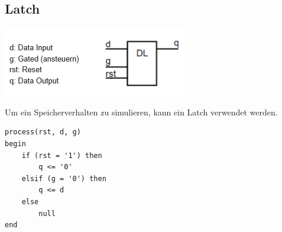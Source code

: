 \subsection{Latch}
\begin{center}
	\includegraphics[width=0.5\columnwidth]{Images/latch}
\end{center}
Um ein Speicherverhalten zu simulieren, kann ein Latch verwendet werden. 
\begin{lstlisting}
process(rst, d, g)
begin
	if (rst = '1') then
		q <= '0' 
	elsif (g = '0') then
		q <= d
	else 
		null
end
\end{lstlisting}